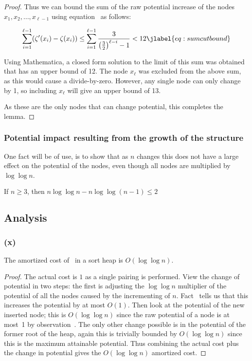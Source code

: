 \begin{fullonly}
\begin{proof}
Thus we can bound the sum of the raw potential increase of the nodes $x_1, x_2, \ldots , x_{\ell-1}$ using equation~ as follows:

\begin{equation}
\sum_{i=1}^{\ell-1} (\zeta'(x_i)-\zeta(x_i)) \leq
 \sum_{i=1}^{\ell-1} \frac{3}{\left( \frac32 \right)^{\ell-i}-1} < 12 \jlabel{eq:sumcutbound}
 \nonumber
 \end{equation}

Using Mathematica, a closed form solution to the limit of this sum was obtained that has an upper bound of 12. The node $x_\ell$ was excluded from the above sum, as this would cause a divide-by-zero. However, any single node can only change by 1, so including $x_\ell$ will give an upper bound of 13.

As these are the only nodes that can change potential, this completes the lemma.


\end{proof}


\subsubsection{Potential impact resulting from the growth of the structure} \checked

One fact will be of use, is to show that as $n$ changes this does not have a large effect on the potential of the nodes, even though all nodes are multiplied by $\log \log n$.

\begin{fact} 
If $n \geq 3$, then $n \log \log n - n \log \log (n-1) \leq 2$
\end{fact}


\subsection{Analysis}

\subsubsection{\opIns(x)}

\begin{lemma}
The amortized cost of \opIns\ in a sort heap is $O(\log \log n)$.
\end{lemma}

\begin{proof}
The actual cost is $1$ as a single pairing is performed. View the change of potential in two steps: the first is adjusting the $\log \log n$ multiplier of the potential of all the nodes caused by the incrementing of $n$. Fact~ tells us that this increases the potential by at most $O(1)$. Then look at the potential of the new inserted node; this is $O(\log \log n)$ since the raw potential of a node is at most~1 by observation~. The only other change possible is in the potential of the former root of the heap, again this is trivially bounded by $O(\log \log n)$ since this is the maximum attainable potential. Thus combining the actual cost plus the change in potential gives the $O(\log \log n)$ amortized cost.
\end{proof}


\end{fullonly}
